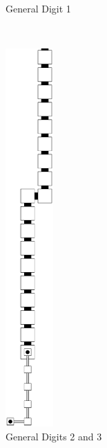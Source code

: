\begin{enumerate}[label={--}]
\begin{figure}[H]
\begin{subfigure}[t]{0.2\textwidth}
                        \caption{\label{fig:warping/post_warp_general_digit1} General Digit 1}
                    \end{subfigure}%
                    ~
                    \begin{subfigure}[t]{0.2\textwidth}
                        \centering
                        \includegraphics[width=0.2\textwidth]{warping/post_warp_general_digit2and3}
                        \caption{\label{fig:warping/post_warp_general_digit2and3} General Digits 2 and 3 }
                    \end{subfigure}%
                    ~
                    \begin{subfigure}[t]{0.2\textwidth}

\end{subfigure}
\end{figure}
\end{enumerate}
